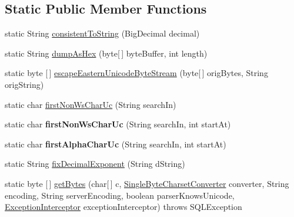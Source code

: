 \subsection*{Static Public Member Functions}
\begin{DoxyCompactItemize}
\item 
static String \mbox{\hyperlink{classcom_1_1mysql_1_1jdbc_1_1_string_utils_acb1c38dccd1d027f74d9098be91229df}{consistent\+To\+String}} (Big\+Decimal decimal)
\item 
static String \mbox{\hyperlink{classcom_1_1mysql_1_1jdbc_1_1_string_utils_ae709b9204f54ce98657cd4133619961b}{dump\+As\+Hex}} (byte\mbox{[}$\,$\mbox{]} byte\+Buffer, int length)
\item 
static byte \mbox{[}$\,$\mbox{]} \mbox{\hyperlink{classcom_1_1mysql_1_1jdbc_1_1_string_utils_a7d62af1e510047299adcf569e5d94c84}{escape\+Eastern\+Unicode\+Byte\+Stream}} (byte\mbox{[}$\,$\mbox{]} orig\+Bytes, String orig\+String)
\item 
static char \mbox{\hyperlink{classcom_1_1mysql_1_1jdbc_1_1_string_utils_a118670d9eee02bcc84a54737721389dd}{first\+Non\+Ws\+Char\+Uc}} (String search\+In)
\item 
\mbox{\label{classcom_1_1mysql_1_1jdbc_1_1_string_utils_a1a984ee5654b56a92fbe157e630aae60}} 
static char {\bfseries first\+Non\+Ws\+Char\+Uc} (String search\+In, int start\+At)
\item 
\mbox{\label{classcom_1_1mysql_1_1jdbc_1_1_string_utils_ac74bb6c2ab4fde108680cdcc1e55e01d}} 
static char {\bfseries first\+Alpha\+Char\+Uc} (String search\+In, int start\+At)
\item 
static String \mbox{\hyperlink{classcom_1_1mysql_1_1jdbc_1_1_string_utils_afb8f4c9222ba22bd576dfb94ec65f625}{fix\+Decimal\+Exponent}} (String d\+String)
\item 
static byte \mbox{[}$\,$\mbox{]} \mbox{\hyperlink{classcom_1_1mysql_1_1jdbc_1_1_string_utils_ab237c5e450dc15a76201b3f13d44e6b3}{get\+Bytes}} (char\mbox{[}$\,$\mbox{]} c, \mbox{\hyperlink{classcom_1_1mysql_1_1jdbc_1_1_single_byte_charset_converter}{Single\+Byte\+Charset\+Converter}} converter, String encoding, String server\+Encoding, boolean parser\+Knows\+Unicode, \mbox{\hyperlink{interfacecom_1_1mysql_1_1jdbc_1_1_exception_interceptor}{Exception\+Interceptor}} exception\+Interceptor)  throws S\+Q\+L\+Exception 
\item 

\end{DoxyCompactItemize}
